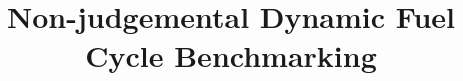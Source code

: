\documentclass{ntmanuscript}
\title{Non-judgemental Dynamic Fuel Cycle Benchmarking}
\date{}
\begin{document}
\begin{abstract}

\end{abstract}












\end{document}
